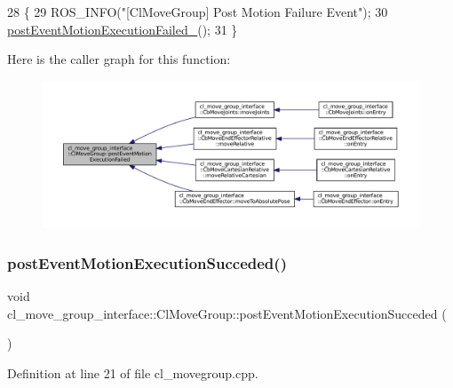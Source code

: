 \begin{DoxyCode}
28 \{
29     ROS\_INFO(\textcolor{stringliteral}{"[ClMoveGroup] Post Motion Failure Event"});
30     \hyperlink{classcl__move__group__interface_1_1ClMoveGroup_ae7ade7ead3390b444ad4f802de1ec62d}{postEventMotionExecutionFailed\_}();
31 \}
\end{DoxyCode}
Here is the caller graph for this function\+:
\nopagebreak
\begin{figure}[H]
\begin{center}
\leavevmode
\includegraphics[width=350pt]{classcl__move__group__interface_1_1ClMoveGroup_a39dc3871d29b2af1ab739057f6ca6daa_icgraph}
\end{center}
\end{figure}
\mbox{\label{classcl__move__group__interface_1_1ClMoveGroup_aebaf269db373d41837bae87651458e54}} 
\subsubsection{\texorpdfstring{post\+Event\+Motion\+Execution\+Succeded()}{postEventMotionExecutionSucceded()}}
{\footnotesize\ttfamily void cl\+\_\+move\+\_\+group\+\_\+interface\+::\+Cl\+Move\+Group\+::post\+Event\+Motion\+Execution\+Succeded (\begin{DoxyParamCaption}{ }\end{DoxyParamCaption})}



Definition at line 21 of file cl\+\_\+movegroup.\+cpp.



